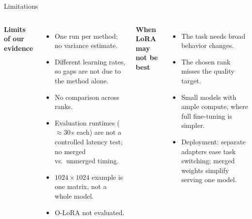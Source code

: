 \documentclass[aspectratio=169,10pt]{beamer}
\begin{document}
\begin{frame}{Limitations}
	\begin{columns}[T]
		\textbf{Limits of our evidence}\small
		\begin{itemize}
			\item One run per method; no variance estimate.
			\item Different learning rates, so gaps are not due to the method alone.
			\item No comparison across ranks.
			\item Evaluation runtimes ($\approx$30\,s each) are not a controlled latency test; no merged vs.\ unmerged timing.
			\item $1024\times1024$ example is one matrix, not a whole model.
			\item O-LoRA not evaluated.
		\end{itemize}
		\textbf{When LoRA may not be best}\small
		\begin{itemize}
			\item The task needs broad behavior changes.
			\item The chosen rank misses the quality target.
			\item Small models with ample compute, where full fine-tuning is simpler.
			\item Deployment: separate adapters ease task switching; merged weights simplify serving one model.
		\end{itemize}
	\end{columns}
\end{frame}
\end{document}

